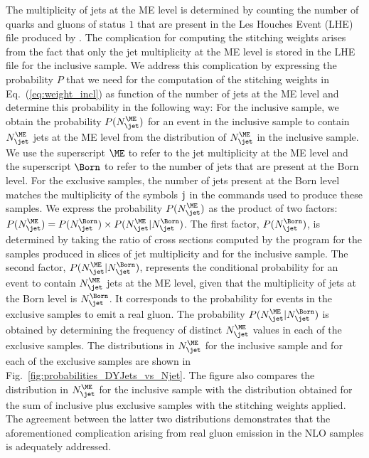 The multiplicity of jets at the ME level is determined by counting the number of quarks and gluons of status $1$ 
that are present in the \textrm{Les Houches Event} (LHE)~\cite{Alwall:2006yp} file produced by \MGvATNLO.
The complication for computing the stitching weights arises from the fact that only the jet multiplicity at the ME level is stored in the LHE file for the inclusive sample.
We address this complication by expressing the probability $P$ that we need for the computation of the stitching weights in Eq.~(\ref{eq:weight_incl})
as function of the number of jets at the ME level and determine this probability in the following way:
For the inclusive sample, we obtain the probability $P(N_{\jet}^{\ME})$ for an event in the inclusive sample
to contain $N_{\jet}^{\ME}$ jets at the ME level 
from the distribution of $N_{\jet}^{\ME}$ in the inclusive sample.
We use the superscript $\ME$ to refer to the jet multiplicity at the ME level
and the superscript $\Born$ to refer to the number of jets that are present at the Born level.
For the exclusive samples, the number of jets present at the Born level matches the multiplicity of the symbols \texttt{j} in the \MGvATNLO commands
used to produce these samples.
We express the probability $P(N_{\jet}^{\ME})$ as the product of two factors: $P(N_{\jet}^{\ME}) = P(N_{\jet}^{\Born}) \times P(N_{\jet}^{\ME} \vert N_{\jet}^{\Born})$.
The first factor, $P(N_{\jet}^{\Born})$, is determined by taking the ratio of cross sections computed by the program \MGvATNLO 
for the samples produced in slices of jet multiplicity and for the inclusive sample.
The second factor, $P(N_{\jet}^{\ME} \vert N_{\jet}^{\Born})$, represents the conditional probability for an event to contain $N_{\jet}^{\ME}$ jets at the ME level,
given that the multiplicity of jets at the Born level is $N_{\jet}^{\Born}$.
It corresponds to the probability for events in the exclusive samples to emit a real gluon.
The probability $P(N_{\jet}^{\ME} \vert N_{\jet}^{\Born})$ is obtained by determining the frequency of distinct $N_{\jet}^{\ME}$ values 
in each of the exclusive samples.
The distributions in $N_{\jet}^{\ME}$ for the inclusive sample and for each of the exclusive samples
are shown in Fig.~\ref{fig:probabilities_DYJets_vs_Njet}.
The figure also compares the distribution in $N_{\jet}^{\ME}$ for the inclusive sample
with the distribution obtained for the sum of inclusive plus exclusive samples with the stitching weights applied.
The agreement between the latter two distributions demonstrates that the aforementioned complication arising from real gluon emission in the NLO samples
is adequately addressed.


